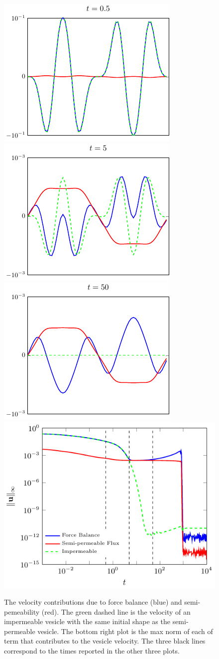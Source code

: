 \documentclass[9pt,twocolumn,twoside,lineno]{pnas-new}
\begin{document}
\begin{figure}[htp]
  \centering
  \includegraphics[width=0.48\linewidth]{figures/ellipseVelocity1.pdf}
  \includegraphics[width=0.48\linewidth]{figures/ellipseVelocity2.pdf}
  \includegraphics[width=0.48\linewidth]{figures/ellipseVelocity3.pdf}
  \includegraphics[width=0.48\linewidth]{figures/ellipseVelocityNorms.pdf}
  \caption{\label{fig:vesVelocity} The velocity contributions due to
  force balance (blue) and semi-pemeability (red). The green dashed line
  is the velocity of an impermeable vesicle with the same initial shape
  as the semi-permeable vesicle. The bottom right plot is the max norm
  of each of term that contributes to the vesicle velocity.  The three
  black lines correspond to the times reported in the other three
  plots.}
\end{figure}
\end{document}
